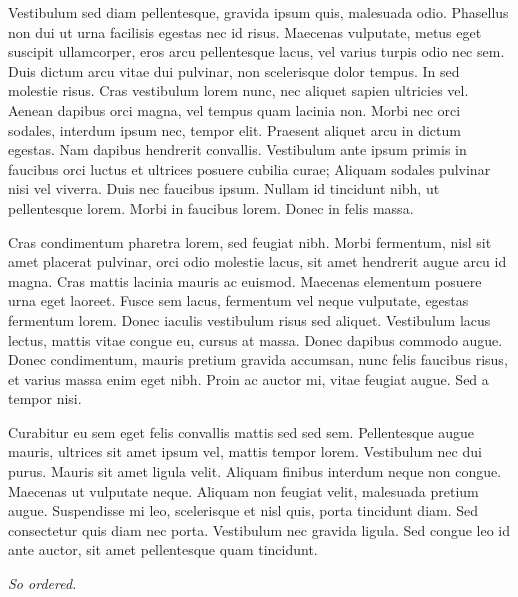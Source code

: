 \documentclass[11pt,twoside]{article}
\begin{document}
Vestibulum sed diam pellentesque, gravida ipsum quis, malesuada odio. Phasellus non dui ut urna facilisis egestas nec id risus. Maecenas vulputate, metus eget suscipit ullamcorper, eros arcu pellentesque lacus, vel varius turpis odio nec sem. Duis dictum arcu vitae dui pulvinar, non scelerisque dolor tempus. In sed molestie risus. Cras vestibulum lorem nunc, nec aliquet sapien ultricies vel. Aenean dapibus orci magna, vel tempus quam lacinia non. Morbi nec orci sodales, interdum ipsum nec, tempor elit. Praesent aliquet arcu in dictum egestas. Nam dapibus hendrerit convallis. Vestibulum ante ipsum primis in faucibus orci luctus et ultrices posuere cubilia curae; Aliquam sodales pulvinar nisi vel viverra. Duis nec faucibus ipsum. Nullam id tincidunt nibh, ut pellentesque lorem. Morbi in faucibus lorem. Donec in felis massa.

Cras condimentum pharetra lorem, sed feugiat nibh. Morbi fermentum, nisl sit amet placerat pulvinar, orci odio molestie lacus, sit amet hendrerit augue arcu id magna. Cras mattis lacinia mauris ac euismod. Maecenas elementum posuere urna eget laoreet. Fusce sem lacus, fermentum vel neque vulputate, egestas fermentum lorem. Donec iaculis vestibulum risus sed aliquet. Vestibulum lacus lectus, mattis vitae congue eu, cursus at massa. Donec dapibus commodo augue. Donec condimentum, mauris pretium gravida accumsan, nunc felis faucibus risus, et varius massa enim eget nibh. Proin ac auctor mi, vitae feugiat augue. Sed a tempor nisi.

Curabitur eu sem eget felis convallis mattis sed sed sem. Pellentesque augue mauris, ultrices sit amet ipsum vel, mattis tempor lorem. Vestibulum nec dui purus. Mauris sit amet ligula velit. Aliquam finibus interdum neque non congue. Maecenas ut vulputate neque. Aliquam non feugiat velit, malesuada pretium augue. Suspendisse mi leo, scelerisque et nisl quis, porta tincidunt diam. Sed consectetur quis diam nec porta. Vestibulum nec gravida ligula. Sed congue leo id ante auctor, sit amet pellentesque quam tincidunt. 


\bigskip
{\flushright \itshape So ordered.\par}
\end{document}
